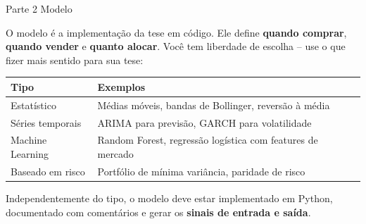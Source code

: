 \documentclass[11pt,a4paper]{article}
\begin{document}
\begin{stepbox}{Parte 2 \quad Modelo}

O modelo \'e a implementa\c{c}\~ao da tese em c\'odigo.
Ele define \textbf{quando comprar}, \textbf{quando vender}
e \textbf{quanto alocar}. Voc\^e tem liberdade de escolha --
use o que fizer mais sentido para sua tese:

\vspace{0.4em}
\begin{tabularx}{\textwidth}{@{}lX@{}}
  \toprule
  \textcolor{quantpurple}{\textbf{Tipo}} &
  \textcolor{quantpurple}{\textbf{Exemplos}} \\
  \midrule
  Estat\'istico &
  M\'edias m\'oveis, bandas de Bollinger, reversão à média \\[3pt]
  S\'eries temporais &
  ARIMA para previs\~ao, GARCH para volatilidade \\[3pt]
  Machine Learning &
  Random Forest, regressão logística com features de mercado \\[3pt]
  Baseado em risco &
  Portf\'olio de m\'inima vari\^ancia, paridade de risco \\
  \bottomrule
\end{tabularx}

\vspace{0.8em}
Independentemente do tipo, o modelo deve estar implementado em Python,
documentado com coment\'arios e gerar os \textbf{sinais de entrada e sa\'ida}.
\end{stepbox}

\vspace{1em}
\end{document}
